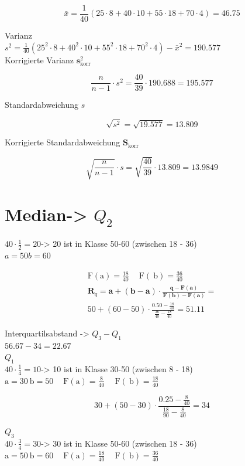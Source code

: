 \documentclass[10pt]{article}
\begin{document}
$$
\bar{x}=\frac{1}{40}(25 \cdot 8+40 \cdot 10+55 \cdot 18+70 \cdot 4)=46.75
$$

Varianz\\
$s^{2}=\frac{1}{40}\left(25^{2} \cdot 8+40^{2} \cdot 10+55^{2} \cdot 18+70^{2} \cdot 4\right)-\bar{x}^{2}=190.577$\\
Korrigierte Varianz $\boldsymbol{s}_{\text {korr }}^{2}$

$$
\frac{n}{n-1} \cdot s^{2}=\frac{40}{39} \cdot 190.688=195.577
$$

Standardabweichung $s$

$$
\sqrt{s^{2}}=\sqrt{19.577}=13.809
$$

Korrigierte Standardabweichung $\boldsymbol{S}_{\text {korr }}$

$$
\sqrt{\frac{n}{n-1}} \cdot s=\sqrt{\frac{40}{39}} \cdot 13.809=13.9849
$$

\section*{Median-> $Q_{2}$}
$40 \cdot \frac{1}{2}=20$-> 20 ist in Klasse 50-60 (zwischen 18 - 36)\\
$a=50 b=60$

$$
\begin{gathered}
\mathrm{F}(\mathrm{a})=\frac{18}{40} \quad \mathrm{~F}(\mathrm{~b})=\frac{36}{40} \\
\boldsymbol{R}_{q}=\boldsymbol{a}+(\boldsymbol{b}-\boldsymbol{a}) \cdot \frac{\boldsymbol{q}-\boldsymbol{F}(\boldsymbol{a})}{\boldsymbol{F}(\boldsymbol{b})-\boldsymbol{F}(\boldsymbol{a})}= \\
50+(60-50) \cdot \frac{0.50-\frac{18}{40}}{\frac{36}{40}-\frac{18}{40}}=51.11
\end{gathered}
$$

Interquartilsabstand -> $Q_{3}-Q_{1}$\\
$56.67-34=22.67$\\
$Q_{1}$\\
$40 \cdot \frac{1}{4}=10$-> 10 ist in Klasse 30-50 (zwischen 8 - 18)\\
$\mathrm{a}=30 \mathrm{~b}=50 \quad \mathrm{~F}(\mathrm{a})=\frac{8}{40} \quad \mathrm{~F}(\mathrm{~b})=\frac{18}{40}$

$$
30+(50-30) \cdot \frac{0.25-\frac{8}{40}}{\frac{18}{90}-\frac{8}{40}}=34
$$

$Q_{3}$\\
$40 \cdot \frac{3}{4}=30$-> 30 ist in Klasse 50-60 (zwischen 18 - 36)\\
$\mathrm{a}=50 \mathrm{~b}=60 \quad \mathrm{~F}(\mathrm{a})=\frac{18}{40} \quad \mathrm{~F}(\mathrm{~b})=\frac{36}{40}$
\end{document}
